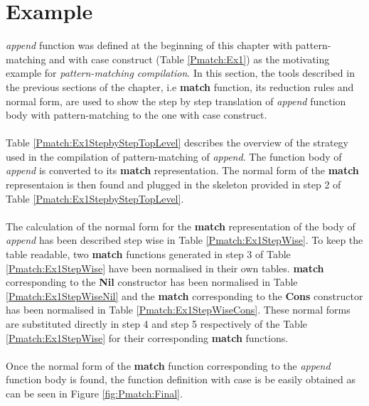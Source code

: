 \documentclass[11pt]{article}
\begin{document}
\section {Example}
 \textit{append} function was defined at the beginning of this chapter with pattern-matching and with {\sf case} construct (Table \ref {Pmatch:Ex1}) as the motivating example for {\em pattern-matching compilation}. In this section, the tools described in the previous sections of the chapter, i.e {\bf match} function, its reduction rules and normal form, are used to show the step by step translation of \textit{append} function body with pattern-matching to the one with {\sf case} construct. 
~~\\~~\\
Table \ref{Pmatch:Ex1StepbyStepTopLevel} describes the overview of the strategy used in the compilation of pattern-matching of \textit{append}. The function body of \textit{append} is converted to its {\bf match} representation. The normal form of the {\bf match} representaion is then found and plugged in the skeleton provided in step 2  of Table \ref{Pmatch:Ex1StepbyStepTopLevel}.
~~\\~~\\
The calculation of the normal form for the  {\bf match} representation of the body of \textit{append} has been described step wise in Table \ref {Pmatch:Ex1StepWise}. To keep the table readable, two {\bf match} functions generated in step 3 of Table \ref {Pmatch:Ex1StepWise} have been normalised in their own tables. {\bf match} corresponding to the {\bf Nil} constructor has been normalised in Table \ref {Pmatch:Ex1StepWiseNil} and the {\bf match} corresponding to the  {\bf Cons} constructor has been normalised in Table \ref {Pmatch:Ex1StepWiseCons}. These normal forms are substituted directly in step 4 and step 5 respectively of the Table \ref {Pmatch:Ex1StepWise} for their corresponding {\bf match} functions.
~~\\~~\\
Once the normal form of the {\bf match} function corresponding to the \textit{append} function body is found, the function definition with {\sf case} is be easily obtained as can be seen in Figure \ref {fig:Pmatch:Final}.

\end{document}
